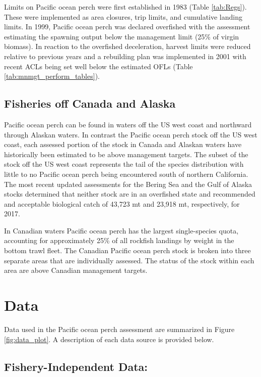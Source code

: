 \documentclass[12pt,]{article}
\begin{document}
Limits on Pacific ocean perch were first established in 1983 (Table
\ref{tab:Regs}). These were implemented as area closures, trip limits,
and cumulative landing limits. In 1999, Pacific ocean perch was declared
overfished with the assessment estimating the spawning output below the
management limit (25\% of virgin biomass). In reaction to the overfished
deceleration, harvest limits were reduced relative to previous years and
a rebuilding plan was implemented in 2001 with recent ACLs being set
well below the estimated OFLs (Table \ref{tab:mnmgt_perform_tables}).

\subsection{Fisheries off Canada and
Alaska}\label{fisheries-off-canada-and-alaska}

Pacific ocean perch can be found in waters off the US west coast and
northward through Alaskan waters. In contrast the Pacific ocean perch
stock off the US west coast, each assessed portion of the stock in
Canada and Alaskan waters have historically been estimated to be above
management targets. The subset of the stock off the US west coast
represents the tail of the species distribution with little to no
Pacific ocean perch being encountered south of northern California. The
most recent updated assessments for the Bering Sea and the Gulf of
Alaska stocks determined that neither stock are in an overfished state
and recommended and acceptable biological catch of 43,723 mt and 23,918
mt, respectively, for 2017.

In Canadian waters Pacific ocean perch has the largest single-species
quota, accounting for approximately 25\% of all rockfish landings by
weight in the bottom trawl fleet. The Canadian Pacific ocean perch stock
is broken into three separate areas that are individually assessed. The
status of the stock within each area are above Canadian management
targets.

\section{Data}\label{data}

Data used in the Pacific ocean perch assessment are summarized in Figure
\ref{fig:data_plot}. A description of each data source is provided
below.

\subsection{Fishery-Independent Data:}\label{fishery-independent-data}
\end{document}
